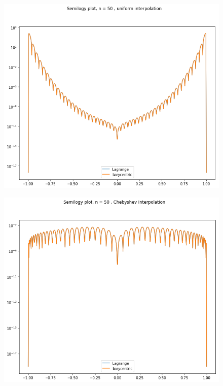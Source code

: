 \documentclass[a4paper]{article}
\begin{document}
\begin{figure}[!ht]
\includegraphics[scale=0.5]{50&U.png}
\end{figure}
\begin{figure}[!ht]
\includegraphics[scale=0.5]{50&C.png}
\end{figure}
\end{document}
